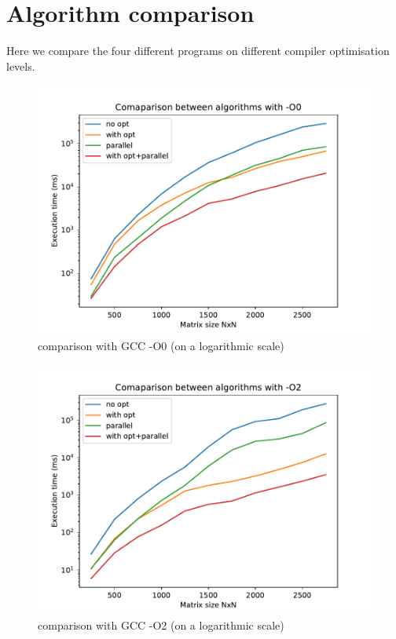 \documentclass {article}
\begin{document}
\section{Algorithm comparison}
Here we compare the four different programs on different compiler optimisation
levels.
\begin{figure}[H]
    \includegraphics[width=\linewidth]{plot/compare_O0.pdf}
    \caption{comparison with GCC -O0 (on a logarithmic scale)}
    \label{fig:compare_O0}
\end{figure}

\begin{figure}[H]
    \includegraphics[width=\linewidth]{plot/compare_O2.pdf}
    \caption{comparison with GCC -O2 (on a logarithmic scale)}
    \label{fig:compare_O2}
\end{figure}
\end{document}

